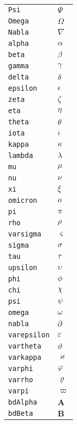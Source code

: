\begin{longtable}{ll}
\texttt{Psi}&${}\Psi {}$\\
\texttt{Omega}&${}\Omega {}$\\
\texttt{Nabla}&${}\nabla {}$\\
\texttt{alpha}&${}\alpha {}$\\
\texttt{beta}&${}\beta {}$\\
\texttt{gamma}&${}\gamma {}$\\
\texttt{delta}&${}\delta {}$\\
\texttt{epsilon}&${}\epsilon {}$\\
\texttt{zeta}&${}\zeta {}$\\
\texttt{eta}&${}\eta {}$\\
\texttt{theta}&${}\theta {}$\\
\texttt{iota}&${}\iota {}$\\
\texttt{kappa}&${}\kappa {}$\\
\texttt{lambda}&${}\lambda {}$\\
\texttt{mu}&${}\mu {}$\\
\texttt{nu}&${}\nu {}$\\
\texttt{xi}&${}\xi {}$\\
\texttt{omicron}&${}o {}$\\
\texttt{pi}&${}\pi {}$\\
\texttt{rho}&${}\rho {}$\\
\texttt{varsigma}&${}\varsigma {}$\\
\texttt{sigma}&${}\sigma {}$\\
\texttt{tau}&${}\tau {}$\\
\texttt{upsilon}&${}\upsilon {}$\\
\texttt{phi}&${}\phi {}$\\
\texttt{chi}&${}\chi {}$\\
\texttt{psi}&${}\psi {}$\\
\texttt{omega}&${}\omega {}$\\
\texttt{nabla}&${}\partial {}$\\
\texttt{varepsilon}&${}\varepsilon {}$\\
\texttt{vartheta}&${}\vartheta {}$\\
\texttt{varkappa}&${}\varkappa {}$\\
\texttt{varphi}&${}\varphi {}$\\
\texttt{varrho}&${}\varrho {}$\\
\texttt{varpi}&${}\varpi {}$\\
\texttt{bdAlpha}&${}\boldsymbol{A} {}$\\
\texttt{bdBeta}&${}\boldsymbol{B} {}$\\

\end{longtable}
